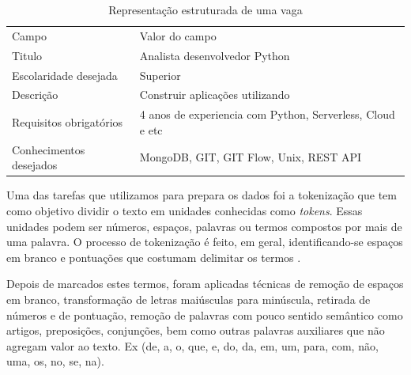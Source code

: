 \documentclass[conference]{IEEEtran}
\begin{document}
\begin{enumerate}
\begin{table}[h]
 \centering
 {\renewcommand\arraystretch{1.25}
\caption{Representação estruturada de uma vaga}
 \begin{tabular}{ l l }
  \cline{1-1}\cline{2-2}  
    \multicolumn{1}{|p{3.0cm}|}{\cellcolor{}Campo \centering } &
    \multicolumn{1}{p{4.217cm}|}{\cellcolor{}Valor do campo \centering }
  \\  
  \cline{1-1}\cline{2-2}  
    \multicolumn{1}{|p{3.0cm}|}{Titulo} &
    \multicolumn{1}{p{4.217cm}|}{ Analista desenvolvedor Python}
  \\  
  \cline{1-1}\cline{2-2}  
    \multicolumn{1}{|p{3.0cm}|}{  Escolaridade desejada } &
    \multicolumn{1}{p{4.217cm}|}{Superior}
  \\  
  \cline{1-1}\cline{2-2}  
    \multicolumn{1}{|p{3.0cm}|}{  Descrição} &
    \multicolumn{1}{p{4.217cm}|}{ Construir aplicações utilizando }
  \\  
  \cline{1-1}\cline{2-2}  
    \multicolumn{1}{|p{3.0cm}|}{  Requisitos obrigatórios } &
    \multicolumn{1}{p{4.217cm}|}{ 4 anos de experiencia com Python, Serverless, Cloud e etc}
  \\  
  \cline{1-1}\cline{2-2}  
    \multicolumn{1}{|p{3.0cm}|}{  Conhecimentos desejados} &
    \multicolumn{1}{p{4.217cm}|}{ MongoDB, GIT, GIT Flow, Unix, REST API}
  \\  
  \hline
 \end{tabular} }
\end{table}


\end{enumerate}

    
    Uma das tarefas que utilizamos para prepara os dados foi a tokenização que tem como objetivo dividir o texto em unidades conhecidas como \textit{tokens}. Essas unidades podem ser números, espaços, palavras ou termos compostos por mais de uma palavra. O processo de tokenização é feito, em geral, identificando-se espaços em branco e pontuações que costumam delimitar os termos \cite{tokenizacao}.
    
    Depois de marcados estes termos, foram aplicadas técnicas de remoção de espaços em branco, transformação de letras maiúsculas para minúscula, retirada de números e de pontuação, remoção de palavras com pouco sentido semântico como artigos, preposições, conjunções, bem como outras palavras auxiliares que não agregam valor ao texto. Ex (de, a, o, que, e, do, da, em, um, para, com, não, uma, os, no, se, na).
    
\end{document}
